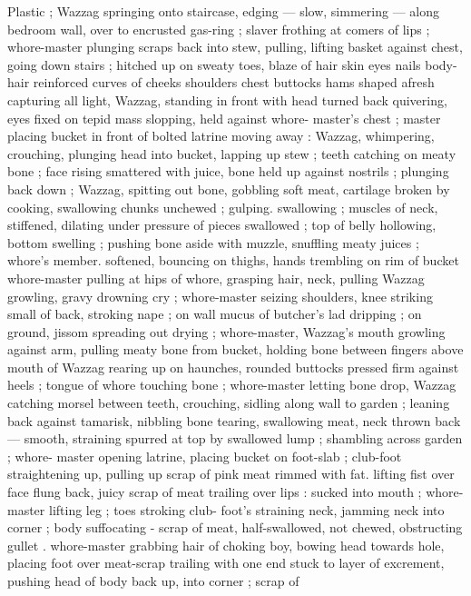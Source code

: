 Plastic ; Wazzag springing onto staircase, edging --- slow, simmering 
--- along bedroom wall, over to encrusted gas-ring ; slaver frothing 
at comers of lips ; whore-master plunging scraps back into stew, 
pulling, lifting basket against chest, going down stairs ; hitched up 
on sweaty toes, blaze of hair skin eyes nails body-hair reinforced 
curves of cheeks shoulders chest buttocks hams shaped afresh 
capturing all light, Wazzag, standing in front with head turned back 
quivering, eyes fixed on tepid mass slopping, held against whore- 
master's chest ; master placing bucket in front of bolted latrine 
moving away : Wazzag, whimpering, crouching, plunging head into 
bucket, lapping up stew ; teeth catching on meaty bone ; face rising 
smattered with juice, bone held up against nostrils ; plunging back 
down ; Wazzag, spitting out bone, gobbling soft meat, cartilage 
broken by cooking, swallowing chunks unchewed ; gulping. 
swallowing ; muscles of neck, stiffened, dilating under pressure of 
pieces swallowed ; top of belly hollowing, bottom swelling ; pushing 
bone aside with muzzle, snuffling meaty juices ; whore's member. 
softened, bouncing on thighs, hands trembling on rim of bucket 
whore-master pulling at hips of whore, grasping hair, neck, pulling 
Wazzag growling, gravy drowning cry ; whore-master seizing 
shoulders, knee striking small of back, stroking nape ; on wall 
mucus of butcher's lad dripping ; on ground, jissom spreading out 
drying ; whore-master, Wazzag's mouth growling against arm, pulling 
meaty bone from bucket, holding bone between fingers above mouth 
of Wazzag rearing up on haunches, rounded buttocks pressed firm 
against heels ; tongue of whore touching bone ; whore-master letting 
bone drop, Wazzag catching morsel between teeth, crouching, sidling 
along wall to garden ; leaning back against tamarisk, nibbling bone 
tearing, swallowing meat, neck thrown back --- smooth, straining 
spurred at top by swallowed lump ; shambling across garden ; whore- 
master opening latrine, placing bucket on foot-slab ; club-foot 
straightening up, pulling up scrap of pink meat rimmed with fat. 
lifting fist over face flung back, juicy scrap of meat trailing over lips 
: sucked into mouth ; whore-master lifting leg ; toes stroking club- 
foot's straining neck, jamming neck into corner ; body suffocating - 
scrap of meat, half-swallowed, not chewed, obstructing gullet . 
whore-master grabbing hair of choking boy, bowing head towards 
hole, placing foot over meat-scrap trailing with one end stuck to layer 
of excrement, pushing head of body back up, into corner ; scrap of 
